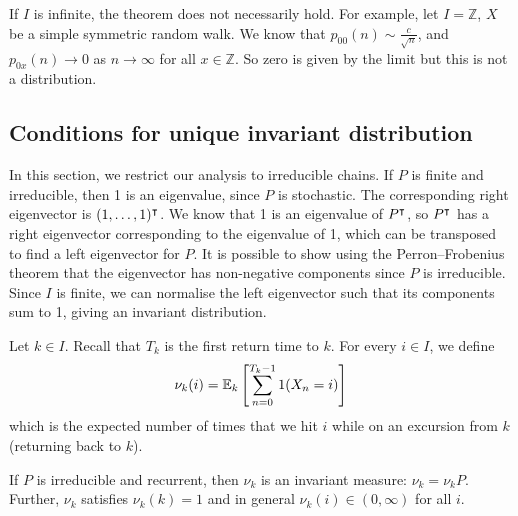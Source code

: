 \begin{remark}
	If \( I \) is infinite, the theorem does not necessarily hold.
	For example, let \( I = \mathbb Z \), \( X \) be a simple symmetric random walk.
	We know that \( p_{00}(n) \sim \frac{c}{\sqrt{n}} \), and \( p_{0x}(n) \to 0 \) as \( n \to \infty \) for all \( x \in \mathbb Z \).
	So zero is given by the limit but this is not a distribution.
\end{remark}

\subsection{Conditions for unique invariant distribution}
In this section, we restrict our analysis to irreducible chains.
If \( P \) is finite and irreducible, then 1 is an eigenvalue, since \( P \) is stochastic.
The corresponding right eigenvector is \( (1, \dots, 1)^\intercal \).
We know that 1 is an eigenvalue of \( P^\intercal \), so \( P^\intercal \) has a right eigenvector corresponding to the eigenvalue of 1, which can be transposed to find a left eigenvector for \( P \).
It is possible to show using the Perron--Frobenius theorem that the eigenvector has non-negative components since \( P \) is irreducible.
Since \( I \) is finite, we can normalise the left eigenvector such that its components sum to 1, giving an invariant distribution.
\begin{definition}
	Let \( k \in I \).
	Recall that \( T_k \) is the first return time to \( k \).
	For every \( i \in I \), we define
	\[
		\nu_k(i) = \mathbb{E}_{k}\left[{\sum_{n=0}^{T_k - 1} 1(X_n = i)}\right]
	\]
	which is the expected number of times that we hit \( i \) while on an excursion from \( k \) (returning back to \( k \)).
\end{definition}
\begin{theorem}
	If \( P \) is irreducible and recurrent, then \( \nu_k \) is an invariant measure: \( \nu_k = \nu_k P \).
	Further, \( \nu_k \) satisfies \( \nu_k(k) = 1 \) and in general \( \nu_k(i) \in (0, \infty) \) for all \( i \).
\end{theorem}
